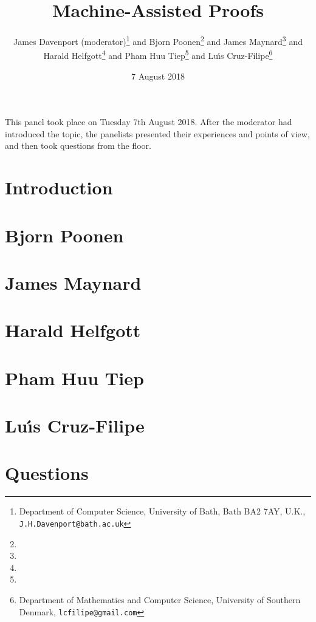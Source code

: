 \documentclass{article}
\begin{document}
\title{Machine-Assisted Proofs}
\author{James Davenport (moderator)\footnote{Department of Computer Science, University of Bath, Bath BA2 7AY, U.K., {\tt J.H.Davenport@bath.ac.uk}}{ } and Bjorn Poonen\footnote{}{ } and James Maynard\footnote{}{ } and \\Harald Helfgott\footnote{}{ } and Pham Huu Tiep\footnote{}{ } and Lu\'\i{}s Cruz-Filipe\footnote{Department of Mathematics and Computer Science, University of Southern Denmark, {\tt lcfilipe@gmail.com}}}
\date{7 August 2018}
\maketitle
This panel took place on Tuesday 7th August 2018. After the moderator had introduced the topic, the panelists presented their experiences and points of view, and then took questions from the floor.
\section{Introduction}

\section{Bjorn Poonen}

\section{James Maynard}

\section{Harald Helfgott}

\section{Pham Huu Tiep}

\section{Lu\'\i{}s Cruz-Filipe}

\section{Questions}


\end{document}
